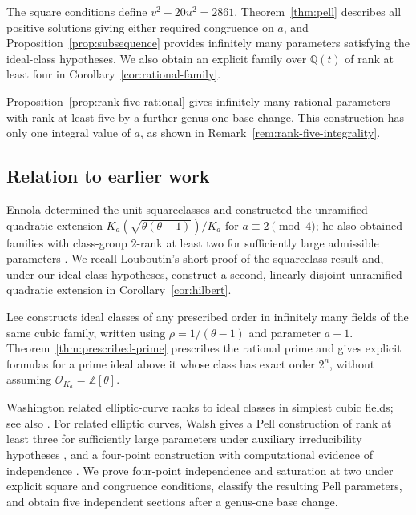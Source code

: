 \documentclass[draft]{publmathdeb}
\theoremstyle{remark}
\numberwithin{equation}{section}
\newcommand{\Q}{\mathbb Q}
\newcommand{\Z}{\mathbb Z}
\begin{document}
The square conditions define $v^2-20u^2=2861$. Theorem~\ref{thm:pell} describes all positive solutions giving either required congruence on $a$, and Proposition~\ref{prop:subsequence} provides infinitely many parameters satisfying the ideal-class hypotheses. We also obtain an explicit family over $\Q(t)$ of rank at least four in Corollary~\ref{cor:rational-family}.

Proposition~\ref{prop:rank-five-rational} gives infinitely many rational parameters with rank at least five by a further genus-one base change. This construction has only one integral value of $a$, as shown in Remark~\ref{rem:rank-five-integrality}.

\subsection*{Relation to earlier work}

Ennola determined the unit squareclasses and constructed the unramified quadratic extension $K_a(\sqrt{\theta(\theta-1)})/K_a$ for $a\equiv2\pmod4$; he also obtained families with class-group $2$-rank at least two for sufficiently large admissible parameters \cite[Propositions 3.3 and 6.1, Theorem 6.1]{Ennola1991}. We recall Louboutin's short proof of the squareclass result \cite[Lemma 6]{Louboutin2017} and, under our ideal-class hypotheses, construct a second, linearly disjoint unramified quadratic extension in Corollary~\ref{cor:hilbert}.

Lee \cite[Theorem 1.1]{Lee2010} constructs ideal classes of any prescribed order in infinitely many fields of the same cubic family, written using $\rho=1/(\theta-1)$ and parameter $a+1$. Theorem~\ref{thm:prescribed-prime} prescribes the rational prime and gives explicit formulas for a prime ideal above it whose class has exact order $2^n$, without assuming $\mathcal O_{K_a}=\Z[\theta]$.

Washington \cite[\S3, Theorem 1]{Washington1987} related elliptic-curve ranks to ideal classes in simplest cubic fields; see also \cite{Duquesne2001,Laoudi2006}. For related elliptic curves, Walsh gives a Pell construction of rank at least three for sufficiently large parameters under auxiliary irreducibility hypotheses \cite[Theorem 1.1]{Walsh2023}, and a four-point construction with computational evidence of independence \cite[\S2, Type III]{Walsh2024}. We prove four-point independence and saturation at two under explicit square and congruence conditions, classify the resulting Pell parameters, and obtain five independent sections after a genus-one base change.
\end{document}
